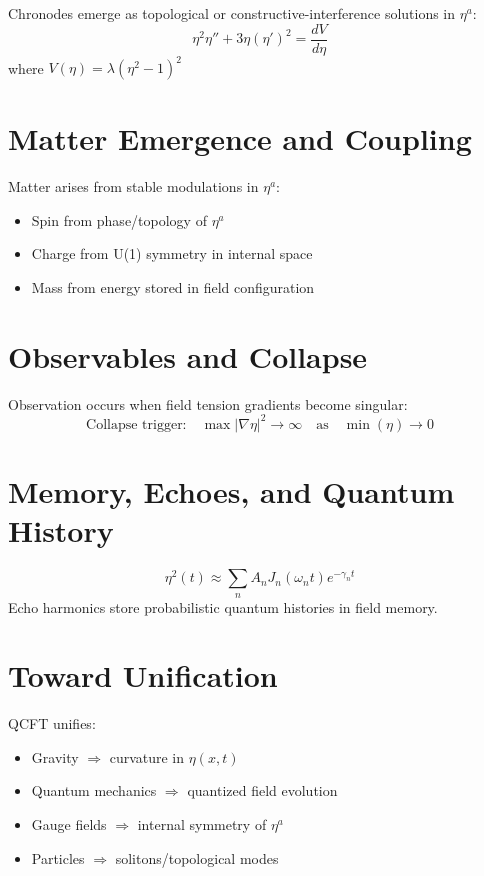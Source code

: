 \documentclass[12pt]{article}
\begin{document}
Chronodes emerge as topological or constructive-interference solutions in $\eta^a$:
\begin{equation}
\eta^2 \eta'' + 3\eta(\eta')^2 = \frac{dV}{d\eta}
\end{equation}
where $V(\eta) = \lambda(\eta^2 - 1)^2$

\section{Matter Emergence and Coupling}

Matter arises from stable modulations in $\eta^a$:
\begin{itemize}
  \item Spin from phase/topology of $\eta^a$
  \item Charge from U(1) symmetry in internal space
  \item Mass from energy stored in field configuration
\end{itemize}

\section{Observables and Collapse}

Observation occurs when field tension gradients become singular:
\begin{equation}
\text{Collapse trigger:} \quad \max|\nabla \eta|^2 \to \infty \quad \text{as} \quad \min(\eta) \to 0
\end{equation}

\section{Memory, Echoes, and Quantum History}

\begin{equation}
\eta^2(t) \approx \sum_n A_n J_n(\omega_n t) e^{-\gamma_n t}
\end{equation}
Echo harmonics store probabilistic quantum histories in field memory.

\section{Toward Unification}

QCFT unifies:
\begin{itemize}
  \item Gravity $\Rightarrow$ curvature in $\eta(x,t)$
  \item Quantum mechanics $\Rightarrow$ quantized field evolution
  \item Gauge fields $\Rightarrow$ internal symmetry of $\eta^a$
  \item Particles $\Rightarrow$ solitons/topological modes
\end{itemize}
\end{document}
